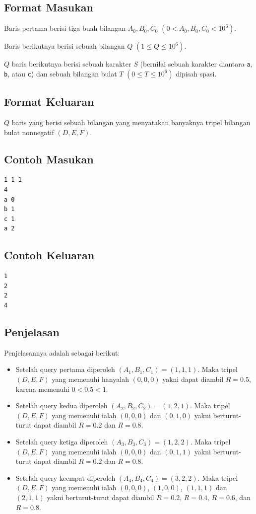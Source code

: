 \documentclass{article}
\begin{document}
\subsection*{Format Masukan}
Baris pertama berisi tiga buah bilangan $A_0, B_0, C_0$ $(0 < A_0, B_0, C_0 < 10^6)$.

Baris berikutnya berisi sebuah bilangan $Q$ $(1 \leq Q \leq 10^6)$.

$Q$ baris berikutnya berisi sebuah karakter $S$ (bernilai sebuah karakter diantara \lstinline|a|, \lstinline|b|, atau \lstinline|c|) dan sebuah bilangan bulat $T$ $(0 \leq T \leq 10^6)$ dipisah spasi.

\subsection*{Format Keluaran}
$Q$ baris yang berisi sebuah bilangan yang menyatakan banyaknya tripel bilangan bulat nonnegatif $\left(D, E, F\right)$.

\begin{multicols}{2}
\subsection*{Contoh Masukan}
\begin{lstlisting}
1 1 1
4
a 0
b 1
c 1
a 2
\end{lstlisting}
\columnbreak
\subsection*{Contoh Keluaran}
\begin{lstlisting}
1
2
2
4
\end{lstlisting}
\vfill
\null
\end{multicols}

\pagebreak
\subsection*{Penjelasan}
Penjelasannya adalah sebagai berikut:
\begin{itemize}

\item Setelah query pertama diperoleh $(A_1, B_1, C_1) = (1,1,1)$. Maka tripel $(D, E, F)$ yang memenuhi hanyalah $(0,0,0)$ yakni dapat diambil $R=0.5$, karena memenuhi $0<0.5<1$.

\item Setelah query kedua diperoleh $(A_2, B_2, C_2) = (1,2,1)$. Maka tripel $(D, E, F)$ yang memenuhi ialah $(0,0,0)$ dan $(0,1,0)$ yakni berturut-turut dapat diambil $R=0.2$ dan $R=0.8$.

\item Setelah query ketiga diperoleh $(A_3, B_3, C_3) = (1,2,2)$. Maka tripel $(D, E, F)$ yang memenuhi ialah $(0,0,0)$ dan $(0,1,1)$ yakni berturut-turut dapat diambil $R=0.2$ dan $R=0.8$.

\item Setelah query keempat diperoleh $(A_4, B_4, C_4) = (3,2,2)$. Maka tripel $(D, E, F)$ yang memenuhi ialah $(0,0,0)$, $(1,0,0)$, $(1,1,1)$ dan $(2,1,1)$ yakni berturut-turut dapat diambil $R=0.2$, $R=0.4$, $R=0.6$, dan $R=0.8$.

\end{itemize}
\end{document}
